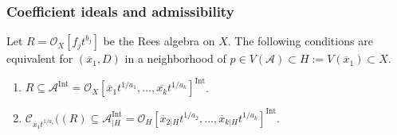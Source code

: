 \documentclass{amsart}
\newcommand{\cA}{{\mathcal A}}
\newcommand{\cC}{{\mathcal C}}
\newcommand{\cI}{{\mathcal I}}
\newcommand{\cO}{{\mathcal O}}
\newcommand{\Int}{{\operatorname{Int}}}
\begin{document}
	



\subsubsection{Coefficient ideals and admissibility}
\begin{lemma} \label{Coef1}  Let $R=\cO_X[f_jt^{b_j}]$ be the Rees algebra on $X$. The following conditions are equivalent for $(\overline{x}_1,D)$ in a neighborhood of  $p\in V(\cA)\subset H:=V(\overline{x}_1)\subset X$.
\begin{enumerate}
\item $R\subseteq \cA^\Int=\cO_X[\overline{x}_1t^{1/a_1},\ldots,\overline{x_k}t^{1/a_k}]^{\Int}$.
\item $\cC_{\overline{x}_1t^{1/a_1}}((R)\subseteq \cA_{|H}^\Int=\cO_H[\overline{x}_{2|H}t^{1/a_2},\ldots,\overline{x}_{k|H}t^{1/a_k}]^\Int$.
 \end{enumerate}
\end{lemma}
\end{document}

